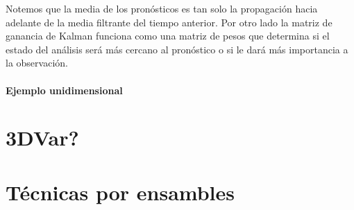 Notemos que la media de los pronósticos es tan solo la propagación hacia adelante de la media filtrante del tiempo anterior. Por otro lado la matriz de ganancia de Kalman funciona como una matriz de pesos que determina si el estado del análisis será más cercano al pronóstico o si le dará más importancia a la observación. 

\paragraph{Ejemplo unidimensional}

\section{3DVar?}

\section{Técnicas por ensambles}
